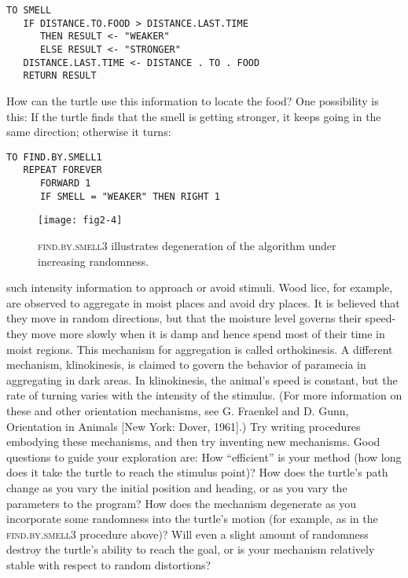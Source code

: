\documentclass{book}
\begin{document}
\begin{verbatim}
TO SMELL
   IF DISTANCE.TO.FOOD > DISTANCE.LAST.TIME
      THEN RESULT <- "WEAKER"
      ELSE RESULT <- "STRONGER"
   DISTANCE.LAST.TIME <- DISTANCE . TO . FOOD
   RETURN RESULT
\end{verbatim}
How can the turtle use this information to locate the food? One possibility is this: If the turtle finds that the smell is getting stronger, it keeps going in the same direction; otherwise it turns:

\begin{verbatim}
TO FIND.BY.SMELL1
   REPEAT FOREVER
      FORWARD 1
      IF SMELL = "WEAKER" THEN RIGHT 1
\end{verbatim}
\begin{figure}
\begin{center}
\texttt{[image: fig2-4]}
\caption{\textsc{find}\textsc{.by}\textsc{.smell3} illustrates degeneration of the algorithm under increasing randomness.}
\end{center}
\end{figure}

such intensity information to approach or avoid stimuli. Wood lice, for
example, are observed to aggregate in moist places and avoid dry places.
It is believed that they move in random directions, but that the moisture
level governs their speed-they move more slowly when it is damp and
hence spend most of their time in moist regions. This mechanism for
aggregation is called orthokinesis. A different mechanism, klinokinesis,
is claimed to govern the behavior of paramecia in aggregating in dark
areas. In klinokinesis, the animal's speed is constant, but the rate of
turning varies with the intensity of the stimulus. (For more information on these and other orientation mechanisms, see G. Fraenkel and
D. Gunn, Orientation in Animals [New York: Dover, 1961].) Try writing procedures embodying these mechanisms, and then try inventing
new mechanisms. Good questions to guide your exploration are: How
``efficient'' is your method (how long does it take the turtle to reach the
stimulus point)? How does the turtle's path change as you vary the initial position and heading, or as you vary the parameters to the program?
How does the mechanism degenerate as you incorporate some randomness into the turtle's motion (for example, as in the \textsc{find}\textsc{.by}\textsc{.smell3}
procedure above)? Will even a slight amount of randomness destroy the
turtle's ability to reach the goal, or is your mechanism relatively stable
with respect to random distortions?
\end{document}
